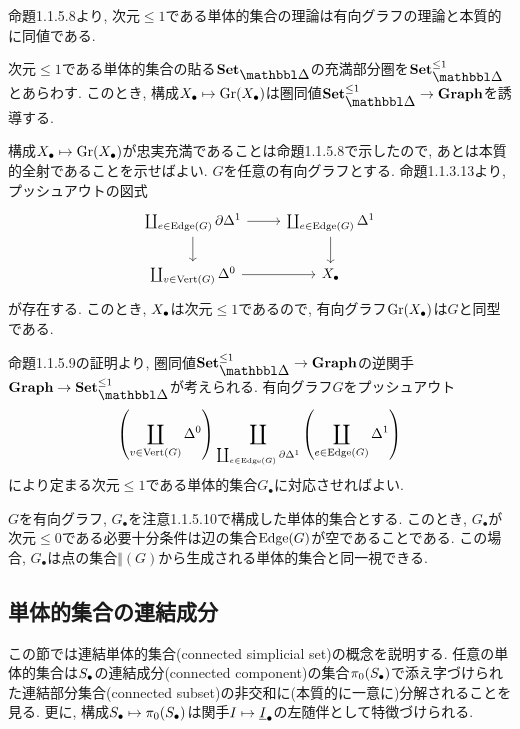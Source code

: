 \documentclass[uplatex, a4paper, 14Q, dvipdfmx]{jsreport}
\begin{document}
命題1.1.5.8より, 次元$\leq 1$である単体的集合の理論は有向グラフの理論と本質的に同値である. 

\begin{prop}
  次元$\leq 1$である単体的集合の貼る$\sset$の充満部分圏を$\sset^{\leq 1}$とあらわす. 
  このとき, 構成$\X \mt \gr(\X)$は圏同値$\sset^{\leq 1} \to \gra$を誘導する. 
\end{prop}

\begin{Proof}
  構成$\X \mt \gr(\X)$が忠実充満であることは命題1.1.5.8で示したので, あとは本質的全射であることを示せばよい.
  $G$を任意の有向グラフとする.
  命題1.1.3.13より, プッシュアウトの図式
  \[\begin{tikzcd}
    {\coprod_{e \in \Edge(G)} \del \Delta^1} & {\coprod_{e \in \Edge(G)} \Delta^1} \\
    {\coprod_{v \in \Vert(G)} \Delta^0 } & \X
    \arrow[from=1-1, to=1-2]
    \arrow[from=1-1, to=2-1]
    \arrow[from=2-1, to=2-2]
    \arrow[from=1-2, to=2-2]
  \end{tikzcd}\]
  が存在する. 
  このとき, $\X$は次元$\leq 1$であるので, 有向グラフ$\gr(\X)$は$G$と同型である. 
\end{Proof}

\begin{remark}
  命題1.1.5.9の証明より, 圏同値$\sset^{\leq 1} \to \gra$の逆関手$\gra \to \sset^{\leq 1}$が考えられる. 
  有向グラフ$G$をプッシュアウト
  \begin{align*}
    \qty( \coprod_{v \in \Vert(G)} \Delta^0) \coprod_{\coprod_{e \in \Edge(G)} \del \Delta^1} \qty( \coprod_{e \in \Edge(G)} \Delta^1 )
  \end{align*}
  により定まる次元$\leq 1$である単体的集合$G_\bullet$に対応させればよい. 
\end{remark}

\begin{example}
  $G$を有向グラフ, $G_\bullet$を注意1.1.5.10で構成した単体的集合とする. 
  このとき, $G_\bullet$が次元$\leq 0$である必要十分条件は辺の集合$\Edge(G)$が空であることである.
  この場合, $G_\bullet$は点の集合$\Vert(G)$から生成される単体的集合と同一視できる. 
\end{example}

\subsection{単体的集合の連結成分}

この節では連結単体的集合(connected simplicial set)の概念を説明する. 
任意の単体的集合は$\S$の連結成分(connected component)の集合$\pi_0(\S)$で添え字づけられた連結部分集合(connected subset)の非交和に(本質的に一意に)分解されることを見る. 
更に, 構成$\S \mt \pi_0(\S)$は関手$I \mt \uline{I}_\bullet$の左随伴として特徴づけられる.
\end{document}
